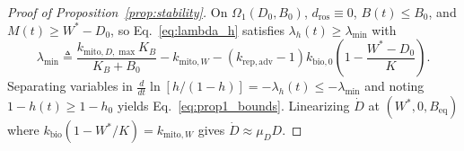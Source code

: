 \documentclass[11pt]{article}
\theoremstyle{plain}
\theoremstyle{remark}
\begin{document}
\begin{proof}[Proof of Proposition~\ref{prop:stability}]
On $\Omega_1(D_0, B_0)$, $d_{\mathrm{ros}} \equiv 0$, $B(t) \le B_0$, and $M(t) \ge W^* - D_0$, so Eq.~\eqref{eq:lambda_h} satisfies $\lambda_h(t) \ge \lambda_{\min}$ with
\begin{equation}
  \lambda_{\min} \triangleq \frac{k_{\mathrm{mito},D,\max}K_B}{K_B + B_0} - k_{\mathrm{mito},W} - (k_{\mathrm{rep,adv}} - 1)k_{\mathrm{bio},0}\!\left(1 - \frac{W^* - D_0}{K}\right).
  \label{eq:lambda_min_analytic}
\end{equation}
Separating variables in $\frac{d}{dt}\ln[h/(1-h)] = -\lambda_h(t) \le -\lambda_{\min}$ and noting $1 - h(t) \ge 1 - h_0$ yields Eq.~\eqref{eq:prop1_bounds}. Linearizing $\dot{D}$ at $(W^*, 0, B_{\mathrm{eq}})$ where $k_{\mathrm{bio}}(1 - W^*/K) = k_{\mathrm{mito},W}$ gives $\dot{D} \approx \mu_D D$.
\end{proof}
\end{document}
